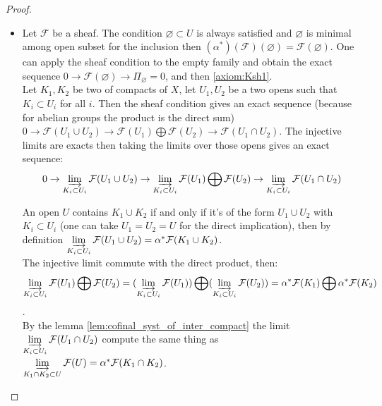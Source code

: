 \begin{proof}
    \begin{itemize}
        \item Let $\mathcal{F}$ be a sheaf. The condition $\varnothing \subset U$ is always satisfied and $\varnothing$ is minimal among open subset for the inclusion then $(\alpha^*)(\mathcal{F})(\varnothing)=\mathcal{F}(\varnothing)$. One can apply the sheaf condition to the empty family and obtain the exact sequence $0\to \mathcal{F}(\varnothing)\to \Pi_{\varnothing}=0$, and then \eqref{axiom:Ksh1}.\\

        Let $K_1,K_2$ be two of compacts of $X$, let $U_1,U_2$ be a two opens such that $K_i\subset U_i$ for all $i$. Then the sheaf condition gives an exact sequence (because for abelian groups the product is the direct sum) $0\to \mathcal{F}(U_1\cup U_2)\to \mathcal{F}(U_1)\bigoplus\mathcal{F}(U_2)\to \mathcal{F}(U_1\cap U_2)$. The injective limits are exacts then taking the limits over those opens gives an exact sequence: 
        \begin{equation}\label{lim_of_sheaf_cond}
            0\to \varinjlim\limits_{K_i\subset U_i}\mathcal{F}(U_1\cup U_2)\to \varinjlim\limits_{K_i\subset U_i}\mathcal{F}(U_1)\bigoplus\mathcal{F}(U_2)\to \varinjlim\limits_{K_i\subset U_i}\mathcal{F}(U_1\cap U_2)
        \end{equation}

        An open $U$ contains $K_1\cup K_2$ if and only if it's of the form $U_1\cup U_2$ with $K_i\subset U_i$ (one can take $U_1=U_2=U$ for the direct implication), then by definition $\varinjlim\limits_{K_i\subset U_i}\mathcal{F}(U_1\cup U_2)=\alpha^*\mathcal{F}(K_1\cup K_2)$.\\
        
        The injective limit commute with the direct product, then: $$\varinjlim\limits_{K_i\subset U_i}\mathcal{F}(U_1)\bigoplus\mathcal{F}(U_2)=(\varinjlim\limits_{K_i\subset U_i}\mathcal{F}(U_1))\bigoplus(\varinjlim\limits_{K_i\subset U_i}\mathcal{F}(U_2))=\alpha^*\mathcal{F}(K_1)\bigoplus\alpha^*\mathcal{F}(K_2)$$.\\
        
        By the lemma \ref{lem:cofinal_syst_of_inter_compact} the limit $\varinjlim\limits_{K_i\subset U_i}\mathcal{F}(U_1\cap U_2)$ compute the same thing as $\varinjlim\limits_{K_1\cap K_2\subset U}\mathcal{F}(U)=\alpha^*\mathcal{F}(K_1\cap K_2)$.\\


\end{itemize}
\end{proof}
